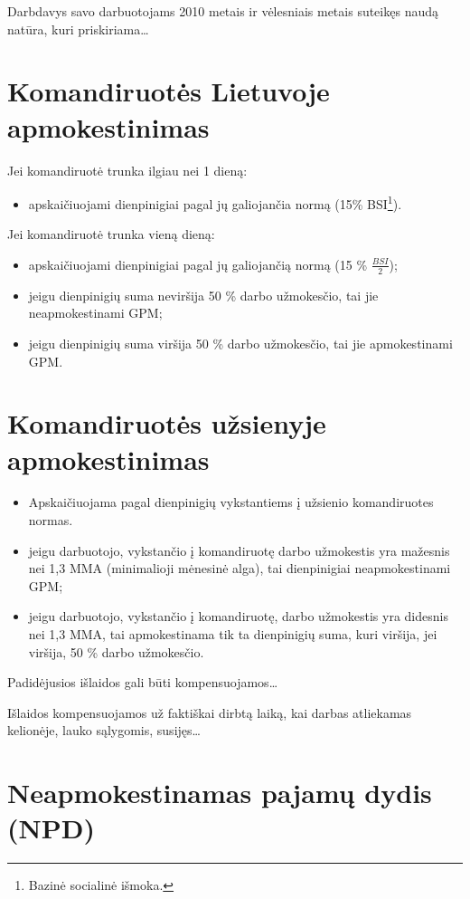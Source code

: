 Darbdavys savo darbuotojams 2010 metais ir vėlesniais metais suteikęs naudą
natūra, kuri priskiriama…

\section{Komandiruotės Lietuvoje apmokestinimas}

Jei komandiruotė trunka ilgiau nei 1 dieną:
\begin{itemize}
  \item apskaičiuojami dienpinigiai pagal jų galiojančia normą
    (15\% BSI\footnote{Bazinė socialinė išmoka.}).
\end{itemize}

Jei komandiruotė trunka vieną dieną:
\begin{itemize}
  \item apskaičiuojami dienpinigiai pagal jų galiojančią normą
    (15 \% $\frac{BSI}{2}$);
  \item jeigu dienpinigių suma neviršija 50 \% darbo užmokesčio,
    tai jie neapmokestinami GPM;
  \item jeigu dienpinigių suma viršija 50 \% darbo užmokesčio,
    tai jie apmokestinami GPM.
\end{itemize}

\section{Komandiruotės užsienyje apmokestinimas}

\begin{itemize}
  \item Apskaičiuojama pagal dienpinigių vykstantiems į užsienio
    komandiruotes normas.
  \item jeigu darbuotojo, vykstančio į komandiruotę darbo
    užmokestis yra mažesnis nei 1,3 MMA (minimalioji mėnesinė
    alga), tai dienpinigiai neapmokestinami GPM;
  \item jeigu darbuotojo, vykstančio į komandiruotę, darbo
    užmokestis yra didesnis nei 1,3 MMA, tai apmokestinama
    tik ta dienpinigių suma, kuri viršija, jei
    viršija, 50 \% darbo užmokesčio.
\end{itemize}

Padidėjusios išlaidos gali būti kompensuojamos…

Išlaidos kompensuojamos už faktiškai dirbtą laiką, kai darbas atliekamas
kelionėje, lauko sąlygomis, susijęs…

\section{Neapmokestinamas pajamų dydis (NPD)}

